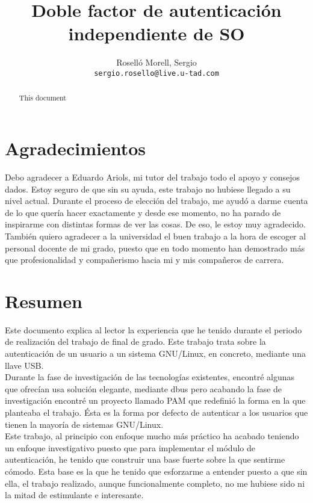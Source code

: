 \documentclass[titlepage]{article}
\title{Doble factor de autenticación independiente de SO}
\author{Roselló Morell, Sergio\\
\texttt{sergio.rosello@live.u-tad.com}}
\begin{document}
\maketitle
\tableofcontents
\clearpage
\section{Agradecimientos}
Debo agradecer a Eduardo Ariols, mi tutor del trabajo todo el apoyo y consejos dados. Estoy seguro de que sin su ayuda, este trabajo no hubiese llegado a su nivel actual. Durante el proceso de elección del trabajo, me ayudó a darme cuenta de lo que quería hacer exactamente y desde ese momento, no ha parado de inspirarme con distintas formas de ver las cosas. De eso, le estoy muy agradecido.\\También quiero agradecer a la universidad el buen trabajo a la hora de escoger al personal docente de mi grado, puesto que en todo momento han demostrado más que profesionalidad y compañerismo hacia mi y mis compañeros de carrera.
\section{Resumen}
Este documento explica al lector la experiencia que he tenido durante el periodo de realización del trabajo de final de grado. Este trabajo trata sobre la autenticación de un usuario a un sistema \Gls{GNU/Linux}, en concreto, mediante una llave \Gls{USB}.\\Durante la fase de investigación de las tecnologías existentes, encontré algunas que ofrecían usa solución elegante, mediante \Gls{dbus} pero acabando la fase de investigación encontré un proyecto llamado \Gls{PAM} que redefinió la forma en la que planteaba el trabajo. Ésta es la forma por defecto de autenticar a los usuarios que tienen la mayoría de sistemas \Gls{GNU/Linux}.\\Este trabajo, al principio con enfoque mucho más práctico ha acabado teniendo un enfoque investigativo puesto que para implementar el módulo de autenticación, he tenido que construir una base fuerte sobre la que sentirme cómodo. Esta base es la que he tenido que esforzarme a entender puesto a que sin ella, el trabajo realizado, aunque funcionalmente completo, no me hubiese sido ni la mitad de estimulante e interesante.

\begin{abstract}
	This document 
\end{abstract}
\end{document}
